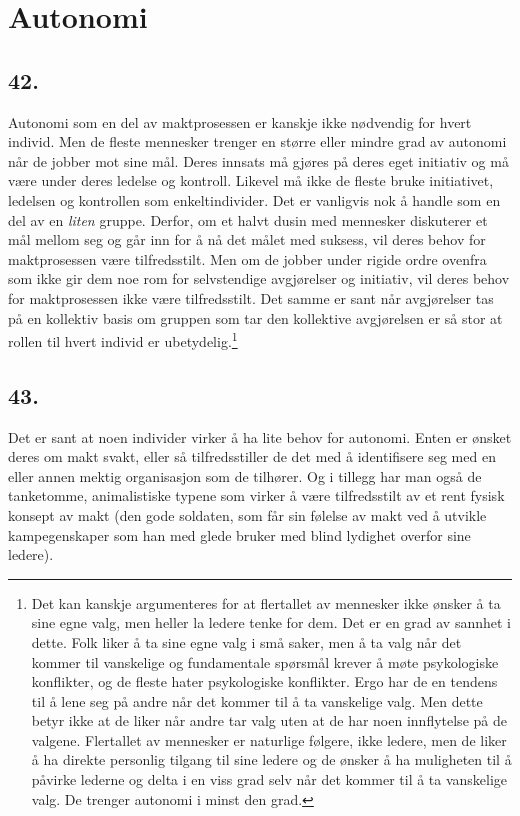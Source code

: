 \documentclass[oneside]{book}
\begin{document}
\chapter{Autonomi}
\section*{42.}
Autonomi som en del av maktprosessen er kanskje ikke nødvendig for hvert
individ. Men de fleste mennesker trenger en større eller mindre grad av
autonomi når de jobber mot sine mål. Deres innsats må gjøres på deres eget
initiativ og må være under deres ledelse og kontroll. Likevel må ikke de fleste
bruke initiativet, ledelsen og kontrollen som enkeltindivider. Det er vanligvis
nok å handle som en del av en \emph{liten} gruppe. Derfor, om et halvt dusin med
mennesker diskuterer et mål mellom seg og går inn for å nå det målet med
suksess, vil deres behov for maktprosessen være tilfredsstilt. Men om de jobber
under rigide ordre ovenfra som ikke gir dem noe rom for selvstendige
avgjørelser og initiativ, vil deres behov for maktprosessen ikke være
tilfredsstilt. Det samme er sant når avgjørelser tas på en kollektiv basis om
gruppen som tar den kollektive avgjørelsen er så stor at rollen til hvert
individ er ubetydelig.\footnote{Det kan kanskje argumenteres for at flertallet
av mennesker ikke ønsker å ta sine egne valg, men heller la ledere tenke for
dem. Det er en grad av sannhet i dette. Folk liker å ta sine egne valg i små
saker, men å ta valg når det kommer til vanskelige og fundamentale spørsmål
krever å møte psykologiske konflikter, og de fleste hater psykologiske
konflikter. Ergo har de en tendens til å lene seg på andre når det kommer til å
ta vanskelige valg. Men dette betyr ikke at de liker når andre tar valg uten at
de har noen innflytelse på de valgene. Flertallet av mennesker er naturlige
følgere, ikke ledere, men de liker å ha direkte personlig tilgang til sine
ledere og de ønsker å ha muligheten til å påvirke lederne og delta i en viss
grad selv når det kommer til å ta vanskelige valg. De trenger autonomi i minst
den grad.}

\section*{43.}
Det er sant at noen individer virker å ha lite behov for autonomi. Enten er
ønsket deres om makt svakt, eller så tilfredsstiller de det med å identifisere
seg med en eller annen mektig organisasjon som de tilhører. Og i tillegg har
man også de tanketomme, animalistiske typene som virker å være tilfredsstilt av
et rent fysisk konsept av makt (den gode soldaten, som får sin følelse av makt
ved å utvikle kampegenskaper som han med glede bruker med blind lydighet
overfor sine ledere).
\end{document}
